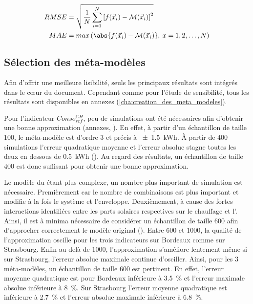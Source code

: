 \begin{align}
  \label{eq:rmse}
  RMSE &= \sqrt{\frac{1}{N}\sum^{N}_{i=1} \left[ f(\vec{x}_{i}) - \mathcal{M}(\vec{x}_{i}) \right]^{2} } \\
  \label{eq:mae}
  MAE  &= max \left( \abs{f(\vec{x}_{i}) - \mathcal{M}(\vec{x}_{i})}, \: x = 1, 2, \dotsc, N \right)
\end{align}



\subsection{Sélection des méta-modèles} %
\label{sub:selection_des_meta_modeles}
Afin d’offrir une meilleure lisibilité, seuls les principaux résultats sont intégrés dans
le cœur du document. Cependant comme pour l’étude de sensibilité, tous
les résultats sont disponibles en annexes (\ref{cha:creation_des_meta_modeles}).

Pour l’indicateur $Conso_{ref}^{CH}$, peu de simulations ont été nécessaires afin
d’obtenir une bonne approximation (annexes, ). En effet,
à partir d’un échantillon de taille $100$, le méta-modèle est d’ordre $3$ et précis à
\SI{+- 1.5}{kWh}. À partir de $400$ simulations l’erreur quadratique moyenne et l’erreur
absolue stagne toutes les deux en dessous de \SI{0.5}{kWh} ().
Au regard des résultats, un échantillon de taille $400$ est donc suffisant pour obtenir
une bonne approximation.

Le modèle du  étant plus complexe, un nombre plus important de simulation est
nécessaire. Premièrement car le nombre de combinaisons est plus important et modifie à la
fois le système et l’enveloppe. Deuxièmement, à cause des fortes interactions identifiées
entre les parts solaires respectives sur le chauffage et l’. Ainsi, il est à
minima nécessaire de considérer un échantillon de taille $600$ afin d’approcher
correctement le modèle original (). Entre $600$ et $1000$, la qualité
de l’approximation oscille pour les trois indicateurs sur Bordeaux comme sur Strasbourg.
Enfin au delà de $1000$, l’approximation s’améliore lentement même si sur Strasbourg,
l’erreur absolue maximale continue d’osciller. Ainsi, pour les $3$ méta-modèles, un
échantillon de taille $600$ est pertinent. En effet, l’erreur moyenne quadratique est pour
Bordeaux inférieure à \SI{3.5}{\percent} et l’erreur maximale absolue inférieure à \SI{8}{\percent}.
Sur Strasbourg l’erreur moyenne quadratique est inférieure à \SI{2.7}{\percent} et
l’erreur absolue maximale inférieure à \SI{6.8}{\percent}.

